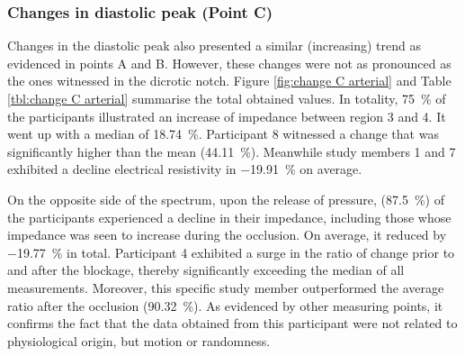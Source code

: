 \subsubsection{Changes in diastolic peak (Point C)}
\label{section apa 2.2.3}
Changes in the diastolic peak also presented a similar (increasing) trend as evidenced in points A and B. However, these changes were not as pronounced as the ones witnessed in the dicrotic notch. Figure \ref{fig:change C arterial} and Table \ref{tbl:change C arterial} summarise the total obtained values. In totality, \SI{75}{\percent} of the participants illustrated an increase of impedance between region 3 and 4. It went up with a median of \SI{18.74}{\percent}. Participant 8 witnessed a change that was significantly higher than the mean (\SI{44.11}{\percent}). Meanwhile study members 1 and 7 exhibited a decline electrical resistivity in \SI{-19.91}{\percent} on average.

On the opposite side of the spectrum, upon the release of pressure, (\SI{87.5}{\percent}) of the participants experienced a decline in their impedance, including those whose impedance was seen to increase during the occlusion. On average, it reduced by \SI{-19.77}{\percent} in total. Participant 4 exhibited a surge in the ratio of change prior to and after the blockage, thereby significantly exceeding the median of all measurements. Moreover, this specific study member outperformed the average ratio after the occlusion (\SI{90.32}{\percent}). As evidenced by other measuring points, it confirms the fact that the data obtained from this participant were not related to physiological origin, but motion or randomness.

